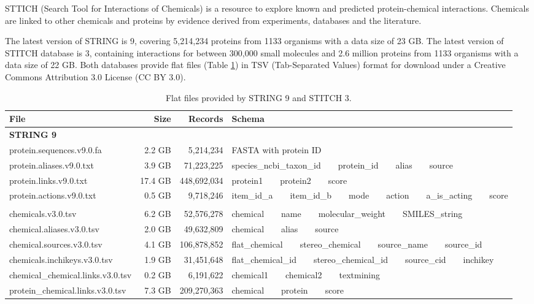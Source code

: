 \documentclass[10pt,conference,compsocconf]{../IEEEtran}
\begin{document}
STTICH (Search Tool for Interactions of Chemicals) \citep{1068,1069,1101} is a resource to explore known and predicted protein-chemical interactions. Chemicals are linked to other chemicals and proteins by evidence derived from experiments, databases and the literature.

The latest version of STRING is 9, covering 5,214,234 proteins from 1133 organisms with a data size of 23 GB. The latest version of STITCH database is 3, containing interactions for between 300,000 small molecules and 2.6 million proteins from 1133 organisms with a data size of 22 GB. Both databases provide flat files (Table \ref{tab:datasets}) in TSV (Tab-Separated Values) format for download under a Creative Commons Attribution 3.0 License (CC BY 3.0).

\begin{table}
\centering
\begin{tabular*}
{\linewidth}
{@{\extracolsep{\fill}}lrrl}
\toprule
File & Size & Records & Schema\\
\midrule
\multicolumn{4}{l}{\textbf{STRING 9}}\\
protein.sequences.v9.0.fa &  2.2 GB &   5,214,234 & FASTA with protein ID\\
protein.aliases.v9.0.txt  &  3.9 GB &  71,223,225 & species\_ncbi\_taxon\_id\ \ \ \ protein\_id\ \ \ \ alias\ \ \ \ source\\
protein.links.v9.0.txt    & 17.4 GB & 448,692,034 & protein1\ \ \ \ protein2\ \ \ \ score\\
protein.actions.v9.0.txt  &  0.5 GB &   9,718,246 & item\_id\_a\ \ \ \ item\_id\_b\ \ \ \ mode\ \ \ \ action\ \ \ \ a\_is\_acting\ \ \ \ score\\
\noalign{\smallskip\smallskip}
\multicolumn{4}{l}{\textbf{STITCH 3}}\\
chemicals.v3.0.tsv                & 6.2 GB &  52,576,278 & chemical\ \ \ \ name\ \ \ \ molecular\_weight\ \ \ \ SMILES\_string\\
chemical.aliases.v3.0.tsv         & 2.0 GB &  49,632,809 & chemical\ \ \ \ alias\ \ \ \ source\\
chemical.sources.v3.0.tsv         & 4.1 GB & 106,878,852 & flat\_chemical\ \ \ \ stereo\_chemical\ \ \ \ source\_name\ \ \ \ source\_id\\
chemicals.inchikeys.v3.0.tsv      & 1.9 GB &  31,451,648 & flat\_chemical\_id\ \ \ \ stereo\_chemical\_id\ \ \ \ source\_cid\ \ \ \ inchikey\\
chemical\_chemical.links.v3.0.tsv & 0.2 GB &   6,191,622 & chemical1\ \ \ \ chemical2\ \ \ \ textmining\\
protein\_chemical.links.v3.0.tsv  & 7.3 GB & 209,270,363 & chemical\ \ \ \ protein\ \ \ \ score\\
\bottomrule
\end{tabular*}
\caption{Flat files provided by STRING 9 and STITCH 3.}
\label{tab:datasets}
\end{table}
\end{document}
